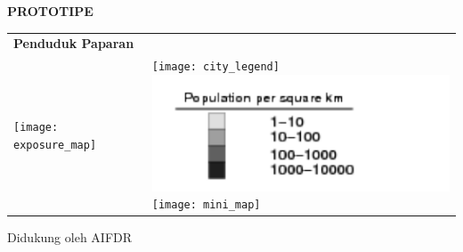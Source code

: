 \documentclass[a4paper]{article}
\begin{document}
\centerline{\Large \textbf{PROTOTIPE}}


\bigskip


\bigskip
\hspace{-6mm} 

\bigskip
\begin{tabular}{@{}l@{}l}
  \Large \textbf{Penduduk Paparan} & \\
  \parbox[t]{0.7\textwidth}{
    \vspace{0pt}
    \texttt{[image: exposure\_map]}} &
  \hspace{-10mm}
  \parbox[t]{0.3\textwidth}{
    \vspace{2mm}
    \texttt{[image: city\_legend]} \\
    \includegraphics{population_legend}\\
    \texttt{[image: mini\_map]}\\
  }
\end{tabular}

\bigskip
\bigskip
\bigskip
\bigskip
\bigskip
\bigskip
\bigskip
\bigskip
\bigskip
\bigskip
\bigskip
\bigskip
\flushright \small Didukung oleh AIFDR %
\end{document}
